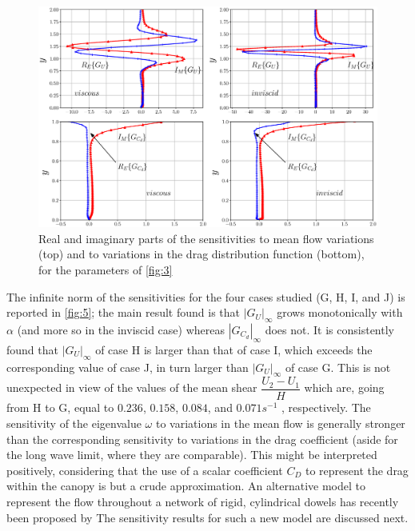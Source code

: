 \begin{figure}[t]
	\centering
	\includegraphics[width=1\linewidth]{chapter_3/figure/4}
	\caption{Real and imaginary parts of the sensitivities to mean flow variations (top) and to variations in the drag distribution
		function (bottom), for the parameters of \ref{fig:3}}
	\label{fig:4}
\end{figure}

The infinite norm of the sensitivities for the four cases studied (G, H, I, and J) is reported in
\ref{fig:5}; the main result found is that ${|G_U|}_{\infty}$ grows monotonically with $\alpha$ (and more so in the inviscid
case) whereas ${|G_{C_d}|}_{\infty}$ does not. It is consistently found that ${|G_U|}_{\infty}$ of case H is larger than that of
case I, which exceeds the corresponding value of case J, in turn larger than ${|G_U|}_{\infty}$ of case G. This is
not unexpected in view of the values of the mean shear $\dfrac{U_2 - U_1}{H}$  which are, going from H to G, equal to $0.236$, $0.158$, $0.084$, and $0.071 s^{-1}$ , respectively. The sensitivity of the eigenvalue $\omega$ to variations
in the mean flow is generally stronger than the corresponding sensitivity to variations in the drag
coefficient (aside for the long wave limit, where they are comparable). This might be interpreted
positively, considering that the use of a scalar coefficient $C_D$ to represent the drag within the canopy
is but a crude approximation. 
\newpage
An alternative model to represent the flow throughout a network of
rigid, cylindrical dowels has recently been proposed by \citet{zampogna2016instability} The sensitivity results for
such a new model are discussed next.

